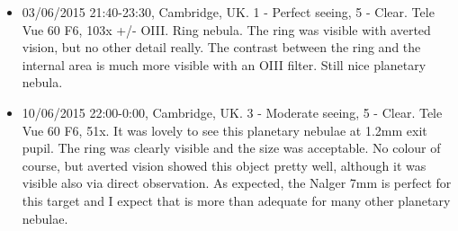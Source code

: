 \begin{itemize}
\item 03/06/2015 21:40-23:30, Cambridge, UK. 1 - Perfect seeing, 5 - Clear. Tele Vue 60 F6, 103x +/- OIII. Ring nebula. The ring was visible with averted vision, but no other detail really. The contrast between the ring and the internal area is much more visible with an OIII filter. Still nice planetary nebula.
\item 10/06/2015 22:00-0:00, Cambridge, UK. 3 - Moderate seeing, 5 - Clear. Tele Vue 60 F6, 51x. It was lovely to see this planetary nebulae at 1.2mm exit pupil. The ring was clearly visible and the size was acceptable. No colour of course, but averted vision showed this object pretty well, although it was visible also via direct observation. As expected, the Nalger 7mm is perfect for this target and I expect that is more than adequate for many other planetary nebulae.
\end{itemize}
